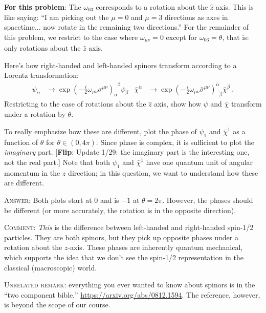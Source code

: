 \documentclass[12pt]{article}
\newcommand{\flip}[1]{{\color{red} [\textbf{Flip}: {#1}]}}
\begin{document}
\textbf{For this problem}: The $\omega_{03}$ corresponds to a rotation about the $\hat z$ axis. This is like saying: ``I am picking out the $\mu = 0$ and $\mu = 3$ directions as axes in spacetime... now rotate in the remaining two directions.'' For the remainder of this problem, we restrict to the case where $\omega_{\mu\nu} = 0$ except for $\omega_{03} = \theta$, that is: only rotations about the $\hat z$ axis.

Here's how right-handed and left-handed spinors transform according to a Lorentz transformation:
\begin{align}
	\psi_\alpha &\to \exp\left(
		-\frac i2 \omega_{\mu\nu} \sigma^{\mu\nu}\right)_\alpha^{\phantom\alpha \beta} \psi_\beta
	&
	\bar\chi^{\dot\alpha}
	&\to \exp\left(-\frac i2 \omega_{\mu\nu} \bar\sigma^{\mu\nu}\right)^{\dot\alpha}_{\phantom\alpha \dot\beta} \bar\chi^{\dot\beta} \ .
\end{align}
Restricting to the case of rotations about the $\hat z$ axis, show how $\psi$ and $\bar\chi$ transform under a rotation by $\theta$. 

To really emphasize how these are different, plot the phase of $\psi_1$ and $\bar\chi^{\dot 1}$ as a function of $\theta$ for $\theta \in (0, 4\pi)$. Since phase is complex, it is sufficient to plot the \emph{imaginary} part. \flip{Update 1/29: the imaginary part is the interesting one, not the real part.} Note that both $\psi_1$ and $\bar\chi^{\dot 1}$ have one quantum unit of angular momentum in the $z$ direction; in this question, we want to understand how these are different.

\textsc{Answer}: Both plots start at 0 and is $-1$ at $\theta = 2\pi$. However, the phases should be different (or more accurately, the rotation is in the opposite direction). 

\textsc{Comment}: \emph{This} is the difference between left-handed and right-handed spin-1/2 particles. They are both spinors, but they pick up opposite phases under a rotation about the $z$-axis. These phases are inherently quantum mechanical, which supports the idea that we don't see the spin-1/2 representation in the classical (macroscopic) world. 

\textsc{Unrelated remark}: everything you ever wanted to know about spinors is in the ``two component bible,'' \url{https://arxiv.org/abs/0812.1594}. The reference, however, is beyond the scope of our course.

\end{document}
